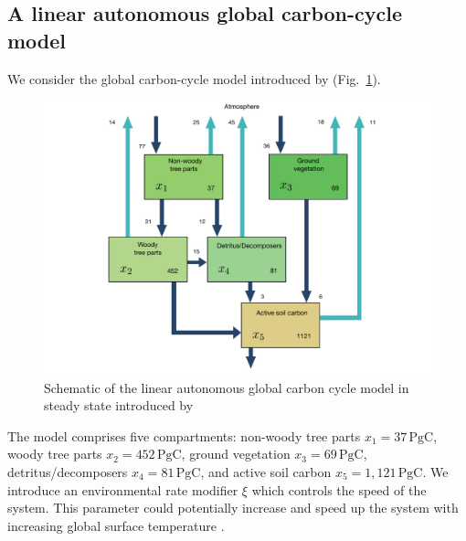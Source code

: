 \documentclass[smallextended]{svjour3}
\newcommand{\peta}{\mathrm{P}}
\newcommand{\gC}{\mathrm{gC}}
\newcommand{\yr}{\mathrm{yr}}
\begin{document}
\subsection{A linear autonomous global carbon-cycle model}
\label{sec:example_1}
We consider the global carbon-cycle model introduced by \citet{Emanuel1981} (Fig.~\ref{fig:Emanuel_model}).
\begin{figure}[htbp]
  \centering
  \includegraphics[width=\linewidth]{figs/EmanuelModelStructure.pdf}
  \caption{Schematic of the linear autonomous global carbon cycle model in steady state introduced by \citet{Emanuel1981}
  }
  \label{fig:Emanuel_model}
\end{figure}
The model comprises five compartments: non-woody tree parts $x_1=37\,\peta\gC$, woody tree parts $x_2=452\,\peta\gC$, ground vegetation $x_3=69\,\peta\gC$, detritus/decomposers $x_4=81\,\peta\gC$, and active soil carbon $x_5=1,121\,\peta\gC$.
We introduce an environmental rate modifier $\xi$ which controls the speed of the system.
This parameter could potentially increase and speed up the system with increasing global surface temperature \citep{Sierra2023PTRS}.
\end{document}
